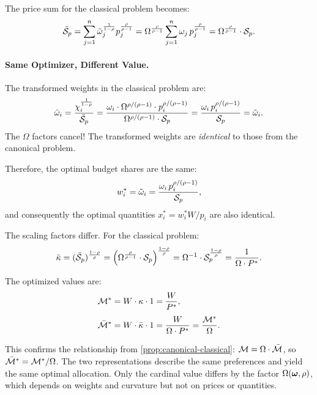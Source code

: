 The price sum for the classical problem becomes:
\begin{equation}
\label{eq:price-sum-classical}
\bar{\mathcal{S}}_p = \sum_{j=1}^{n} \tilde{\omega}_j^{\frac{1}{1-\rho}} p_j^{\frac{\rho}{\rho-1}} = \Omega^{\frac{\rho}{\rho-1}} \sum_{j=1}^{n} \omega_j \, p_j^{\frac{\rho}{\rho-1}} = \Omega^{\frac{\rho}{\rho-1}} \cdot \mathcal{S}_p.
\end{equation}

\paragraph{Same Optimizer, Different Value.}
The transformed weights in the classical problem are:
\[
\hat{\omega}_i = \frac{\chi_i^{\frac{1}{1-\rho}}}{\bar{\mathcal{S}}_p} = \frac{\omega_i \cdot \Omega^{\rho/(\rho-1)} \cdot p_i^{\rho/(\rho-1)}}{\Omega^{\rho/(\rho-1)} \cdot \mathcal{S}_p} = \frac{\omega_i \, p_i^{\rho/(\rho-1)}}{\mathcal{S}_p} = \tilde{\omega}_i.
\]
The $\Omega$ factors cancel! The transformed weights are \emph{identical} to those from the canonical problem.

Therefore, the optimal budget shares are the same:
\begin{equation}
w_i^* = \tilde{\omega}_i = \frac{\omega_i \, p_i^{\rho/(\rho-1)}}{\mathcal{S}_p},
\end{equation}
and consequently the optimal quantities $x_i^* = w_i^* W / p_i$ are also identical.

The scaling factors differ. For the classical problem:
\[
\bar{\kappa} = (\bar{\mathcal{S}}_p)^{\frac{1-\rho}{\rho}} = \left( \Omega^{\frac{\rho}{\rho-1}} \cdot \mathcal{S}_p \right)^{\frac{1-\rho}{\rho}} = \Omega^{-1} \cdot \mathcal{S}_p^{\frac{1-\rho}{\rho}} = \frac{1}{\Omega \cdot P^{*}}.
\]

The optimized values are:
\begin{align}
\mathcal{M}^* &= W \cdot \kappa \cdot 1 = \frac{W}{P^{*}}, \\[4pt]
\bar{\mathcal{M}}^* &= W \cdot \bar{\kappa} \cdot 1 = \frac{W}{\Omega \cdot P^{*}} = \frac{\mathcal{M}^*}{\Omega}.
\end{align}

\begin{calloutnote}
This confirms the relationship from \cref{prop:canonical-classical}: $\mathcal{M} = \Omega \cdot \bar{\mathcal{M}}$, so $\bar{\mathcal{M}}^* = \mathcal{M}^*/\Omega$. The two representations describe the same preferences and yield the same optimal allocation. Only the cardinal value differs by the factor $\Omega(\boldsymbol{\omega}, \rho)$, which depends on weights and curvature but not on prices or quantities.
\end{calloutnote}


